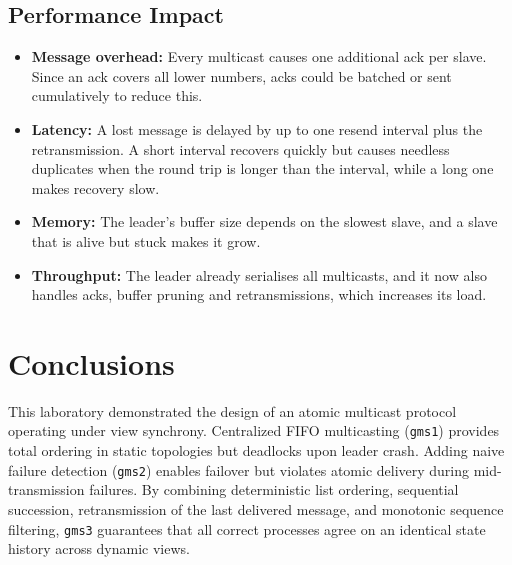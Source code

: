 \documentclass[a4paper, 11pt]{article}
\begin{document}
\subsection{Performance Impact}
\begin{itemize}
    \item \textbf{Message overhead:} Every multicast causes one additional ack per slave. Since an ack covers all lower numbers, acks could be batched or sent cumulatively to reduce this.
    \item \textbf{Latency:} A lost message is delayed by up to one resend interval plus the retransmission. A short interval recovers quickly but causes needless duplicates when the round trip is longer than the interval, while a long one makes recovery slow.
    \item \textbf{Memory:} The leader's buffer size depends on the slowest slave, and a slave that is alive but stuck makes it grow.
    \item \textbf{Throughput:} The leader already serialises all multicasts, and it now also handles acks, buffer pruning and retransmissions, which increases its load.
\end{itemize}


\section{Conclusions}

This laboratory demonstrated the design of an atomic multicast protocol operating under view synchrony. Centralized FIFO multicasting (\texttt{gms1}) provides total ordering in static topologies but deadlocks upon leader crash. Adding naive failure detection (\texttt{gms2}) enables failover but violates atomic delivery during mid-transmission failures. By combining deterministic list ordering, sequential succession, retransmission of the last delivered message, and monotonic sequence filtering, \texttt{gms3} guarantees that all correct processes agree on an identical state history across dynamic views.
\end{document}
